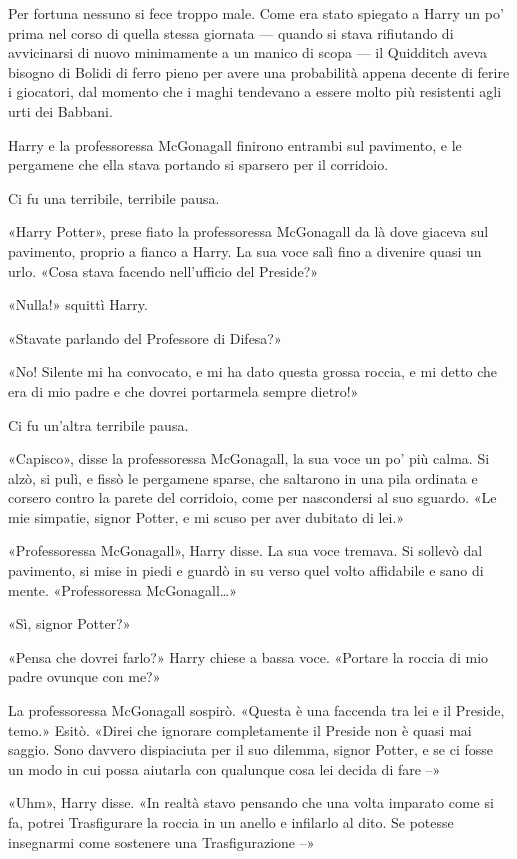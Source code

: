 Per fortuna nessuno si fece troppo male. Come era stato spiegato a Harry un po’ prima nel corso di quella stessa giornata — quando si stava rifiutando di avvicinarsi di nuovo minimamente a un manico di scopa — il Quidditch aveva bisogno di Bolidi di ferro pieno per avere una probabilità appena decente di ferire i giocatori, dal momento che i maghi tendevano a essere molto più resistenti agli urti dei Babbani.

Harry e la professoressa McGonagall finirono entrambi sul pavimento, e le pergamene che ella stava portando si sparsero per il corridoio.

Ci fu una terribile, terribile pausa.

«Harry Potter», prese fiato la professoressa McGonagall da là dove giaceva sul pavimento, proprio a fianco a Harry. La sua voce salì fino a divenire quasi un urlo. «Cosa stava facendo nell’ufficio del Preside?»

«Nulla!» squittì Harry.

«Stavate parlando del Professore di Difesa?»

«No! Silente mi ha convocato, e mi ha dato questa grossa roccia, e mi detto che era di mio padre e che dovrei portarmela sempre dietro!»

Ci fu un’altra terribile pausa.

«Capisco», disse la professoressa McGonagall, la sua voce un po’ più calma. Si alzò, si pulì, e fissò le pergamene sparse, che saltarono in una pila ordinata e corsero contro la parete del corridoio, come per nascondersi al suo sguardo. «Le mie simpatie, signor Potter, e mi scuso per aver dubitato di lei.»

«Professoressa McGonagall», Harry disse. La sua voce tremava. Si sollevò dal pavimento, si mise in piedi e guardò in su verso quel volto affidabile e sano di mente. «Professoressa McGonagall…»

«Sì, signor Potter?»

«Pensa che dovrei farlo?» Harry chiese a bassa voce. «Portare la roccia di mio padre ovunque con me?»

La professoressa McGonagall sospirò. «Questa è una faccenda tra lei e il Preside, temo.» Esitò. «Direi che ignorare completamente il Preside non è quasi mai saggio. Sono davvero dispiaciuta per il suo dilemma, signor Potter, e se ci fosse un modo in cui possa aiutarla con qualunque cosa lei decida di fare –»

«Uhm», Harry disse. «In realtà stavo pensando che una volta imparato come si fa, potrei Trasfigurare la roccia in un anello e infilarlo al dito. Se potesse insegnarmi come sostenere una Trasfigurazione –»

